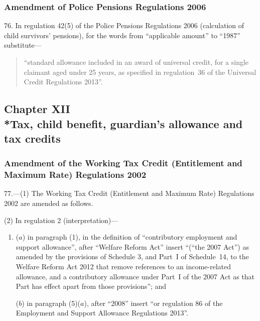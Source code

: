 \documentclass[12pt,a4paper]{article}
\begin{document}
\subsubsection[76. Amendment of Police Pensions Regulations 2006]{Amendment of Police Pensions Regulations 2006}

76.  In regulation 42(5) of the Police Pensions Regulations 2006 (calculation of child survivors’ pensions), for the words from “applicable amount” to “1987” substitute—
\begin{quotation}
“standard allowance included in an award of universal credit, for a single claimant aged under 25 years, as specified in regulation~36 of the Universal Credit Regulations 2013”.
\end{quotation}

\subsection[Chapter XII --- Tax, child benefit, guardian's allowance and tax credits]{Chapter XII\\*Tax, child benefit, guardian's allowance and tax credits}

\renewcommand\parthead{--- Part III Chapter XII}

\subsubsection[77. Amendment of the Working Tax Credit (Entitlement and Maximum Rate) Regulations 2002]{Amendment of the Working Tax Credit (Entitlement and Maximum Rate) Regulations 2002}

77.—(1) The Working Tax Credit (Entitlement and Maximum Rate) Regulations 2002 are amended as follows.

(2) In regulation 2 (interpretation)---
\begin{enumerate}\item[]
($a$) in paragraph (1), in the definition of “contributory employment and support allowance”, after “Welfare Reform Act” insert “(“the 2007 Act”) as amended by the provisions of Schedule 3, and Part~I of Schedule~14, to the Welfare Reform Act 2012 that remove references to an income-related allowance, and a contributory allowance under Part~I of the 2007 Act as that Part has effect apart from those provisions”; and

($b$) in paragraph (5)($a$), after “2008” insert “or regulation 86 of the Employment and Support Allowance Regulations 2013”.
\end{enumerate}
\end{document}
